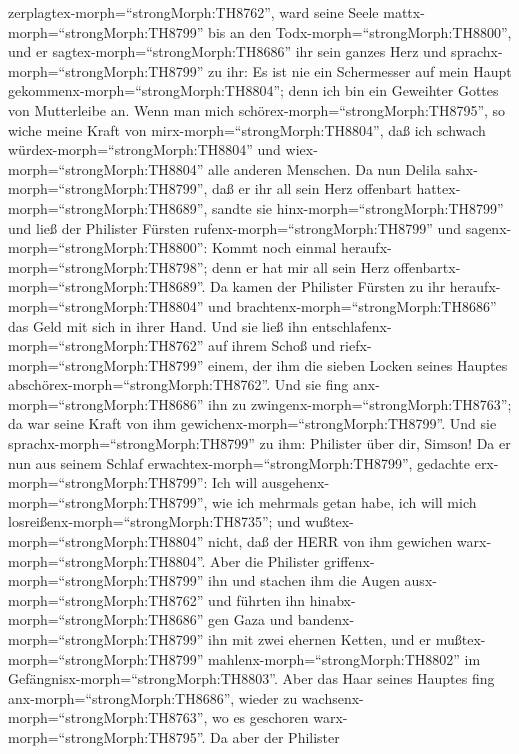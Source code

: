 zerplagtex-morph=``strongMorph:TH8762'', ward seine Seele
mattx-morph=``strongMorph:TH8799'' bis an den
Todx-morph=``strongMorph:TH8800'',  und er
sagtex-morph=``strongMorph:TH8686'' ihr sein ganzes Herz und
sprachx-morph=``strongMorph:TH8799'' zu ihr: Es ist nie ein Schermesser
auf mein Haupt gekommenx-morph=``strongMorph:TH8804''; denn ich bin ein
Geweihter Gottes von Mutterleibe an. Wenn man mich
schörex-morph=``strongMorph:TH8795'', so wiche meine Kraft von
mirx-morph=``strongMorph:TH8804'', daß ich schwach
würdex-morph=``strongMorph:TH8804'' und
wiex-morph=``strongMorph:TH8804'' alle anderen Menschen. 
Da nun Delila sahx-morph=``strongMorph:TH8799'', daß er ihr all sein
Herz offenbart hattex-morph=``strongMorph:TH8689'', sandte sie
hinx-morph=``strongMorph:TH8799'' und ließ der Philister Fürsten
rufenx-morph=``strongMorph:TH8799'' und
sagenx-morph=``strongMorph:TH8800'': Kommt noch einmal
heraufx-morph=``strongMorph:TH8798''; denn er hat mir all sein Herz
offenbartx-morph=``strongMorph:TH8689''. Da kamen der Philister Fürsten
zu ihr heraufx-morph=``strongMorph:TH8804'' und
brachtenx-morph=``strongMorph:TH8686'' das Geld mit sich in ihrer Hand.
 Und sie ließ ihn entschlafenx-morph=``strongMorph:TH8762''
auf ihrem Schoß und riefx-morph=``strongMorph:TH8799'' einem, der ihm
die sieben Locken seines Hauptes abschörex-morph=``strongMorph:TH8762''.
Und sie fing anx-morph=``strongMorph:TH8686'' ihn zu
zwingenx-morph=``strongMorph:TH8763''; da war seine Kraft von ihm
gewichenx-morph=``strongMorph:TH8799''.  Und sie
sprachx-morph=``strongMorph:TH8799'' zu ihm: Philister über dir, Simson!
Da er nun aus seinem Schlaf erwachtex-morph=``strongMorph:TH8799'',
gedachte erx-morph=``strongMorph:TH8799'': Ich will
ausgehenx-morph=``strongMorph:TH8799'', wie ich mehrmals getan habe, ich
will mich losreißenx-morph=``strongMorph:TH8735''; und
wußtex-morph=``strongMorph:TH8804'' nicht, daß der HERR von ihm gewichen
warx-morph=``strongMorph:TH8804''.  Aber die Philister
griffenx-morph=``strongMorph:TH8799'' ihn und stachen ihm die Augen
ausx-morph=``strongMorph:TH8762'' und führten ihn
hinabx-morph=``strongMorph:TH8686'' gen Gaza und
bandenx-morph=``strongMorph:TH8799'' ihn mit zwei ehernen Ketten, und er
mußtex-morph=``strongMorph:TH8799'' mahlenx-morph=``strongMorph:TH8802''
im Gefängnisx-morph=``strongMorph:TH8803''.  Aber das Haar
seines Hauptes fing anx-morph=``strongMorph:TH8686'', wieder zu
wachsenx-morph=``strongMorph:TH8763'', wo es geschoren
warx-morph=``strongMorph:TH8795''.  Da aber der Philister
